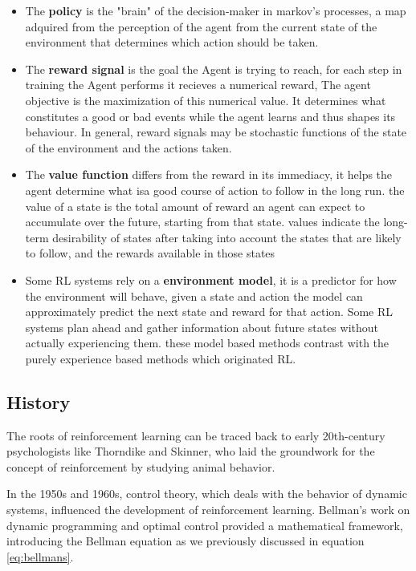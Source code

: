 \begin{itemize}
    \item The \textbf{policy} is the "brain" of the decision-maker in markov's processes, a map adquired from the perception of the agent from the current state of the environment that determines which action should be taken.
    
    \item The \textbf{reward signal} is the goal the Agent is trying to reach, for each step in training the Agent performs it recieves a numerical reward, The agent objective is the maximization of this numerical value. It determines what constitutes a good or bad events while the agent learns and thus shapes its behaviour. In general, reward signals may be stochastic functions of the state of the environment and the actions taken.
    
    \item The \textbf{value function} differs from the reward in its immediacy, it helps the agent determine what isa good course of action to follow in the long run. the value of a state is the total amount of reward an agent can expect to accumulate over the future, starting from that state. values indicate the long-term desirability of states after taking into account the states that are likely to follow, and the rewards available in those states
     
    \item Some RL systems rely on a \textbf{environment model}, it is a predictor for how the environment will behave, given a state and action the model can approximately predict the next state and reward for that action. Some RL systems plan ahead and gather information about future states without actually experiencing them. these model based methods contrast with the purely experience based methods which originated RL.
\end{itemize}

\subsection*{History}
The roots of reinforcement learning can be traced back to early 20th-century psychologists like Thorndike\cite{} and Skinner\cite{}, who laid the groundwork for the concept of reinforcement by studying animal behavior.

In the 1950s and 1960s, control theory, which deals with the behavior of dynamic systems, influenced the development of reinforcement learning. Bellman's work on dynamic programming and optimal control provided a mathematical framework, introducing the Bellman equation as we previously discussed in equation \ref{eq:bellmans}.

